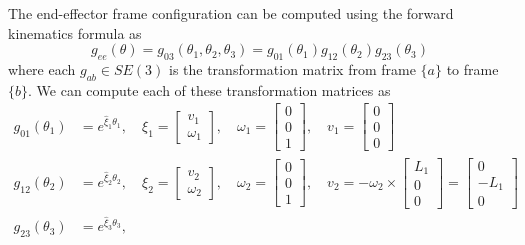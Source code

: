 The end-effector frame configuration can be computed using the forward kinematics formula as
\begin{equation}
    g_{e e}(\theta)
    =
    g_{0 3}(\theta_{1}, \theta_{2}, \theta_{3})
    =
    g_{0 1}(\theta_{1}) g_{1 2}(\theta_{2}) g_{2 3}(\theta_{3})
\end{equation}
where each \( g_{a b} \in SE(3) \) is the transformation matrix from frame \( \{ a \} \) to frame \( \{ b \} \).
We can compute each of these transformation matrices as
\begin{align*}
    g_{0 1}(\theta_{1})
     & =
    e^{\widehat{\xi}_{1} \theta_{1}},
    \quad
    \xi_{1}
    =
    \begin{bmatrix}
        v_1 \\
        \omega_1
    \end{bmatrix},
    \quad
    \omega_1
    =
    \begin{bmatrix}
        0 \\
        0 \\
        1
    \end{bmatrix},
    \quad
    v_1
    =
    \begin{bmatrix}
        0 \\
        0 \\
        0
    \end{bmatrix}
    \\
    g_{1 2}(\theta_{2})
     & =
    e^{\widehat{\xi}_{2} \theta_{2}},
    \quad
    \xi_{2}
    =
    \begin{bmatrix}
        v_2 \\
        \omega_2
    \end{bmatrix},
    \quad
    \omega_2
    =
    \begin{bmatrix}
        0 \\
        0 \\
        1
    \end{bmatrix},
    \quad
    v_2
    =
    - \omega_2 \times
    \begin{bmatrix}
        L_1 \\
        0   \\
        0
    \end{bmatrix}
    =
    \begin{bmatrix}
        0    \\
        -L_1 \\
        0
    \end{bmatrix}
    \\
    g_{2 3}(\theta_{3})
     & =
    e^{\widehat{\xi}_{3} \theta_{3}},

\end{align*}
